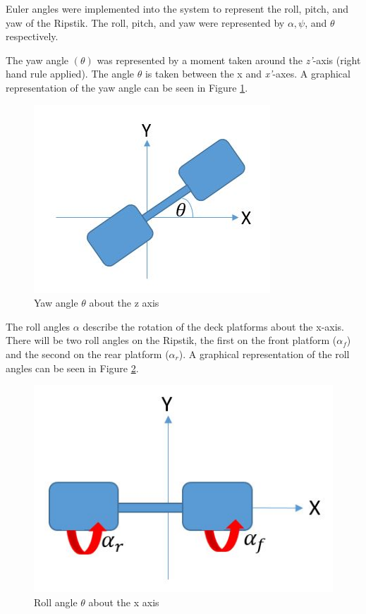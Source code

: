 \par
Euler angles were implemented into the system to represent the roll, pitch, and yaw of the Ripstik. The roll, pitch, and yaw were represented by $\alpha, \psi$, and $\theta$ respectively.
\par
The yaw angle $(\theta)$ was represented by a moment taken around the \textit{z'}-axis (right hand rule applied). The angle $\theta$ is taken between the {x} and \textit{x'}-axes. A graphical representation of the yaw angle can be seen in Figure \ref{fig:Yaw_angle}.
\begin{figure}[!htb]
\centering
{}
\includegraphics[width=\linewidth]{Yaw_angle.JPG}
\caption{Yaw angle $\theta$ about the z axis}\label{fig:Yaw_angle}
\endminipage
\end{figure}   
\par
The roll angles $\alpha$ describe the rotation of the deck platforms about the {x}-axis. There will be two roll angles on the Ripstik, the first on the front platform ($\alpha_f$) and the second on the rear platform ($\alpha_r$). A graphical representation of the roll angles can be seen in Figure \ref{fig:Roll_angle}.
\begin{figure}[!htb]
\centering
{}
\includegraphics[width=\linewidth]{Roll_angle.JPG}
\caption{Roll angle $\theta$ about the x axis}\label{fig:Roll_angle}
\endminipage
\end{figure}

